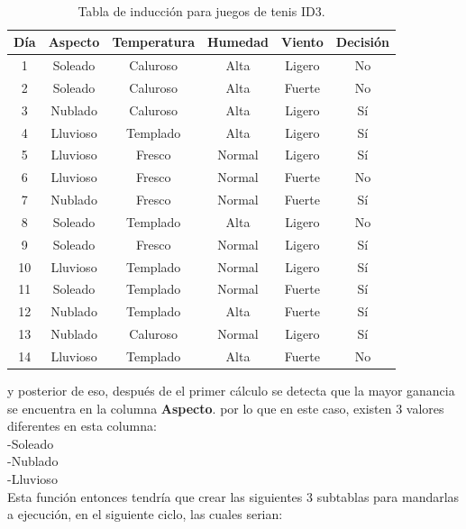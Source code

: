 \\
\begin{table}[!hb]
	\begin{center}
		\label{tab:tablaInduccionID3}
		\begin{tabular}{c|c|c|c|c|c}
			\textbf{Día} & \textbf{Aspecto} & \textbf{Temperatura} & \textbf{Humedad} & \textbf{Viento} & \textbf{Decisión}\\
			\hline
			1 & Soleado & Caluroso & Alta & Ligero & No\\
			2 & Soleado & Caluroso & Alta & Fuerte & No\\
			3 & Nublado & Caluroso & Alta & Ligero & Sí\\
			4 & Lluvioso & Templado & Alta & Ligero & Sí\\
			5 & Lluvioso & Fresco & Normal & Ligero & Sí\\
			6 & Lluvioso & Fresco & Normal & Fuerte & No\\
			7 & Nublado & Fresco & Normal & Fuerte & Sí\\
			8 & Soleado & Templado & Alta & Ligero & No\\
			9 & Soleado & Fresco & Normal & Ligero & Sí\\
			10 & Lluvioso & Templado & Normal & Ligero & Sí\\
			11 & Soleado & Templado & Normal & Fuerte & Sí\\
			12 & Nublado & Templado & Alta & Fuerte & Sí\\
			13 & Nublado & Caluroso & Normal & Ligero & Sí\\
			14 & Lluvioso & Templado & Alta & Fuerte & No\\
		\end{tabular}
	\end{center}
	\caption{Tabla de inducción para juegos de tenis ID3.}
\end{table}
y posterior de eso, después de el primer cálculo se detecta que la mayor ganancia se encuentra en la columna \textbf{Aspecto}. por lo que en este caso, existen 3 valores diferentes en esta columna:\\
-Soleado\\
-Nublado\\
-Lluvioso\\
Esta función entonces tendría que crear las siguientes 3 subtablas para mandarlas a ejecución, en el siguiente ciclo, las cuales serian:\\
